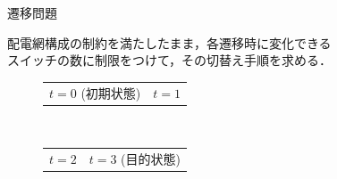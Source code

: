 \documentclass[dvipdfmx,11pt]{beamer}
\begin{document}
\begin{frame}{遷移問題}
 \begin{block}{}
   配電網構成の制約を満たしたまま，各遷移時に変化できる\\
  スイッチの数に制限をつけて，その切替え手順を求める．
 \end{block}
 \vspace{-0.15cm}
 \begin{exampleblock}{}
  \begin{figure}[htbp]
   \begin{tabular}[tb]{cc}
	\begin{minipage}{0.5\hsize}
	 \centering
	 
	 $t=0$ (初期状態)
	\end{minipage}
	& 
	\hspace{-0.5cm}
	\begin{minipage}{0.5\hsize}
	 \centering
	 
	 $t=1$
	\end{minipage} 
   \end{tabular}\\
   \vspace{0.25cm}
   \begin{tabular}[tb]{cc}
	\begin{minipage}{0.5\hsize}
	 \centering
	 
	 $t=2$
	\end{minipage}
	&
	\hspace{-0.5cm}
	\begin{minipage}{0.5\hsize}
	\centering
	 
	 $t=3$ (目的状態)
	\end{minipage}
   \end{tabular}
  \end{figure}
 \end{exampleblock}
\end{frame}
\end{document}
